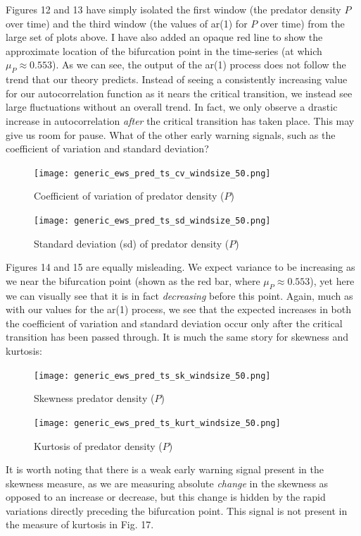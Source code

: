 \documentclass[12pt]{article}
\begin{document}
Figures 12 and 13 have simply isolated the first window (the predator density $P$ over time) and the third window (the values of ar(1) for $P$ over time) from the large set of plots above. I have also added an opaque red line to show the approximate location of the bifurcation point in the time-series (at which $\mu_P \approx 0.553$). As we can see, the output of the ar(1) process does not follow the trend that our theory predicts. Instead of seeing a consistently increasing value for our autocorrelation function as it nears the critical transition, we instead see large fluctuations without an overall trend. In fact, we only observe a drastic increase in autocorrelation \emph{after} the critical transition has taken place. This may give us room for pause. What of the other early warning signals, such as the coefficient of variation and standard deviation?

\begin{figure}[!htb]
\begin{centering}
  \texttt{[image: generic\_ews\_pred\_ts\_cv\_windsize\_50.png]}
  \caption{Coefficient of variation of predator density ($P$)} 
\endminipage\hfill
{}
  \texttt{[image: generic\_ews\_pred\_ts\_sd\_windsize\_50.png]}
  \caption{Standard deviation (sd) of predator density ($P$)}
\endminipage\hfill
\end{centering}
\end{figure}
\FloatBarrier

Figures 14 and 15 are equally misleading. We expect variance to be increasing as we near the bifurcation point (shown as the red bar, where $\mu_P \approx 0.553$), yet here we can visually see that it is in fact \emph{decreasing} before this point. Again, much as with our values for the ar(1) process, we see that the expected increases in both the coefficient of variation and standard deviation occur only after the critical transition has been passed through. It is much the same story for skewness and kurtosis:

\begin{figure}[!htb]
\begin{centering}
  \texttt{[image: generic\_ews\_pred\_ts\_sk\_windsize\_50.png]}
  \caption{Skewness predator density ($P$)} 
\endminipage\hfill
{}
  \texttt{[image: generic\_ews\_pred\_ts\_kurt\_windsize\_50.png]}
  \caption{Kurtosis of predator density ($P$)}
\endminipage\hfill
\end{centering}
\end{figure}
\FloatBarrier
It is worth noting that there is a weak early warning signal present in the skewness measure, as we are measuring absolute \emph{change} in the skewness as opposed to an increase or decrease, but this change is hidden by the rapid variations directly preceding the bifurcation point. This signal is not present in the measure of kurtosis in Fig. 17.
\end{document}
